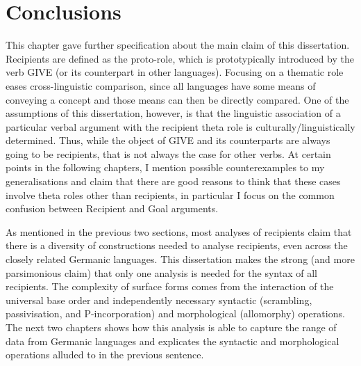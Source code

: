 \section{Conclusions}
This chapter gave further specification about the main claim of this dissertation. Recipients are defined as the proto-role, which is prototypically introduced by the verb GIVE (or its counterpart in other languages). Focusing on a thematic role eases cross-linguistic comparison, since all languages have some means of conveying a concept and those means can then be directly compared. One of the assumptions of this dissertation, however, is that the linguistic association of a particular verbal argument with the recipient theta role is culturally/linguistically determined. Thus, while the object of GIVE and its counterparts are always going to be recipients, that is not always the case for other verbs. At certain points in the following chapters, I mention possible counterexamples to my generalisations and claim that there are good reasons to think that these cases involve theta roles other than recipients, in particular I focus on the common confusion between Recipient and Goal arguments.

As mentioned in the previous two sections, most analyses of recipients claim that there is a diversity of constructions needed to analyse recipients, even across the closely related Germanic languages. This dissertation makes the strong (and more parsimonious claim) that only one analysis is needed for the syntax of all recipients. The complexity of surface forms comes from the interaction of the universal base order and independently necessary syntactic (scrambling, passivisation, and P-incorporation) and morphological (allomorphy) operations. The next two chapters shows how this analysis is able to capture the range of data from Germanic languages and explicates the syntactic and morphological operations alluded to in the previous sentence.

%
